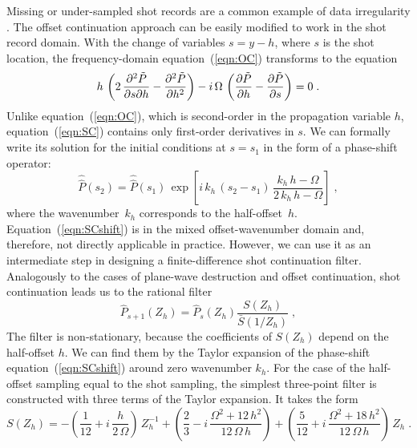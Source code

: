   Missing or under-sampled shot records are a common example of data
  irregularity \cite[]{Crawley.sepphd.104}. The offset continuation
  approach can be easily modified to work in the shot record domain.
  With the change of variables $s = y - h$, where $s$ is the shot
  location, the frequency-domain equation~(\ref{eqn:OC}) transforms to
  the equation
  \begin{equation}
    h \, \left( 2\,{\partial^2 \tilde{P} \over \partial s \partial h} - 
      {\partial^2 \tilde{P} \over \partial h^2} \right) - 
    i\,\Omega \, \left({\partial \tilde{P} \over   {\partial h}} -
        {\partial \tilde{P} \over   {\partial s}}\right) = 0 \;.
    \label{eqn:SC} 
  \end{equation}
  Unlike equation~(\ref{eqn:OC}), which is second-order in the
  propagation variable $h$, equation~(\ref{eqn:SC}) contains only
  first-order derivatives in $s$. We can formally write its solution
  for the initial conditions at $s=s_1$ in the form of a phase-shift
  operator:
    \begin{equation}     
      \widehat{\widehat{P}}(s_2) = \widehat{\widehat{P}}(s_1)\,
      \exp{\left[i\,k_h\,\left(s_2-s_1\right)\,
          \frac{k_h\,h-\Omega}{2\,k_h\,h-\Omega}\right]}\;,
    \label{eqn:SCshift} 
  \end{equation}
  where the wavenumber~$k_h$ corresponds to the half-offset~$h$.
  Equation~(\ref{eqn:SCshift}) is in the mixed offset-wavenumber
  domain and, therefore, not directly applicable in practice. However,
  we can use it as an intermediate step in designing a
  finite-difference shot continuation filter. Analogously to the cases
  of plane-wave destruction and offset continuation, shot continuation
  leads us to the rational filter
  \begin{equation}
    \label{eqn:SCpass}
    \hat{P}_{s+1}(Z_h) = 
    \hat{P}_{s} (Z_h) \frac{S(Z_h)}{\bar{S}(1/Z_h)}\;,
  \end{equation}
  The filter is non-stationary, because the coefficients of $S(Z_h)$
  depend on the half-offset $h$. We can find them by the Taylor
  expansion of the phase-shift equation~(\ref{eqn:SCshift}) around
  zero wavenumber $k_h$. For the case of the half-offset sampling
  equal to the shot sampling, the simplest three-point filter is
  constructed with three terms of the Taylor expansion. It takes the
  form
  \begin{equation}
    \label{eqn:SCfilt}
    S(Z_h) = - \left(\frac{1}{12} + i\,\frac{h}{2\,\Omega}\right)\,Z_h^{-1} + 
    \left(\frac{2}{3} - i\,\frac{\Omega^2 + 12\,h^2}{12\,\Omega\,h}\right) +
    \left(\frac{5}{12} + i\,\frac{\Omega^2 + 18\,h^2}{12\,\Omega\,h}\right)\,
    Z_h\;.
  \end{equation}
  
